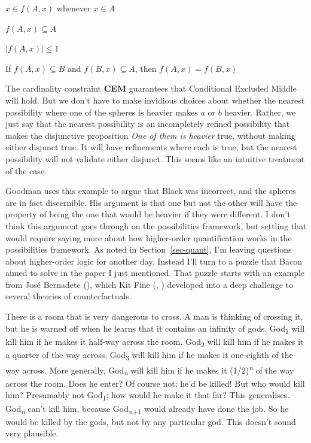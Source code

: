 \documentclass[
  11pt,
  letterpaper,
  DIV=11,
  numbers=noendperiod,
  twoside]{scrartcl}
\providecommand{\tightlist}{%
  \setlength{\itemsep}{0pt}\setlength{\parskip}{0pt}}
\begin{document}
\begin{description}
\tightlist
\item[\textbf{MP}]
\(x \in f(A, x)\) whenever \(x \in A\)
\item[\textbf{ID}]
\(f(A, x) \subseteq A\)
\item[\textbf{CEM}]
\(|f(A, x)| \leq 1\)
\item[\textbf{AB}]
If \(f(A, x) \subseteq B\) and \(f(B, x) \subseteq A\), then
\(f(A, x) = f(B, x)\)
\end{description}

The cardinality constraint \textbf{CEM} guarantees that Conditional
Excluded Middle will hold. But we don't have to make invidious choices
about whether the nearest possibility where one of the spheres is
heavier makes \(a\) or \(b\) heavier. Rather, we just say that the
nearest possibility is an incompletely refined possibility that makes
the disjunctive proposition \emph{One of them is heavier} true, without
making either disjunct true. It will have refinements where each is
true, but the nearest possibility will not validate either disjunct.
This seems like an intuitive treatment of the case.

Goodman uses this example to argue that Black was incorrect, and the
spheres are in fact discernible. His argument is that one but not the
other will have the property of being the one that would be heavier if
they were different. I don't think this argument goes through on the
possibilities framework, but settling that would require saying more
about how higher-order quantification works in the possibilities
framework. As noted in Section~\ref{sec-quant}, I'm leaving questions
about higher-order logic for another day. Instead I'll turn to a puzzle
that Bacon aimed to solve in the paper I just mentioned. That puzzle
starts with an example from José Bernadete
(), which Kit Fine
(, )
developed into a deep challenge to several theories of counterfactuals.

There is a room that is very dangerous to cross. A man is thinking of
crossing it, but he is warned off when he learns that it contains an
infinity of gods. God\textsubscript{1} will kill him if he makes it
half-way across the room. God\textsubscript{2} will kill him if he makes
it a quarter of the way across. God\textsubscript{3} will kill him if he
makes it one-eighth of the way across. More generally,
God\textsubscript{\emph{n}} will kill him if he makes it
(1/2)\textsuperscript{\emph{n}} of the way across the room. Does he
enter? Of course not; he'd be killed! But who would kill him? Presumably
not God\textsubscript{1}; how would he make it that far? This
generalises. God\textsubscript{\emph{n}} can't kill him, because
God\textsubscript{\emph{n}+1} would already have done the job. So he
would be killed by the gods, but not by any particular god. This doesn't
sound very plausible.
\end{document}
